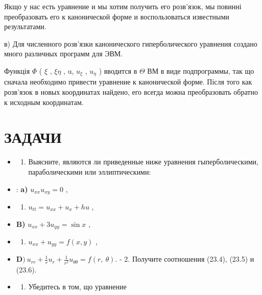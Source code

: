 \documentclass[
  ukrainian,
]{article}
\providecommand{\tightlist}{%
  \setlength{\itemsep}{0pt}\setlength{\parskip}{0pt}}
\begin{document}
Якщо у нас есть уравнение и мы хотим получить его розв'язок, мы повинні
преобразовать его к канонической форме и воспользоваться известными
результатами.

в) Для численного розв'язки канонического гиперболического уравнения
создано много различных программ для ЭВМ.

Функція \(\Phi\) ( \(\xi\) , \(\xi \eta\) , u, \(u_{\xi}\) ,
\(u_{\eta}\) ) вводится в \(\Theta\) ВМ в виде подпрограммы, так що
сначала необходимо привести уравнение к канонической форме. Після того
как розв'язок в новых координатах найдено, его всегда можна
преобразовать обратно к исходным координатам.

\section{ЗАДАЧИ}\label{ux437ux430ux434ux430ux447ux438-6}

\begin{itemize}
\tightlist
\item
  \begin{enumerate}
  \def\labelenumi{\arabic{enumi}.}
  \tightlist
  \item
    Выясните, являются ли приведенные ниже уравнения гыперболическими,
    параболическими или эллиптическими:
  \end{enumerate}
\item
  : \textbf{a)} \(u_{xx} u_{xy} = 0\) ,
\item
  \begin{enumerate}
  \def\labelenumi{\arabic{enumi})}
  \setcounter{enumi}{5}
  \tightlist
  \item
    \(u_{tt} = u_{xx} + u_x + hu\) ,
  \end{enumerate}
\item
  \textbf{B)} \(u_{xx} + 3u_{yy} = \sin x\) ,
\item
  \begin{enumerate}
  \def\labelenumi{\alph{enumi})}
  \setcounter{enumi}{17}
  \tightlist
  \item
    \(u_{xx} + u_{yy} = f(x, y)\) ,
  \end{enumerate}
\item
  \(\mathbf{D} ) \ u_{rr} + \frac{1}{r} u_r + \frac{1}{r^2} u_{\theta \theta} = f(r, \ \theta).\)
  - 2. Получите соотношения (23.4), (23.5) и (23.6).
\item
  \begin{enumerate}
  \def\labelenumi{\arabic{enumi}.}
  \setcounter{enumi}{2}
  \tightlist
  \item
    Убедитесь в том, що уравнение
  \end{enumerate}
\end{itemize}
\end{document}
